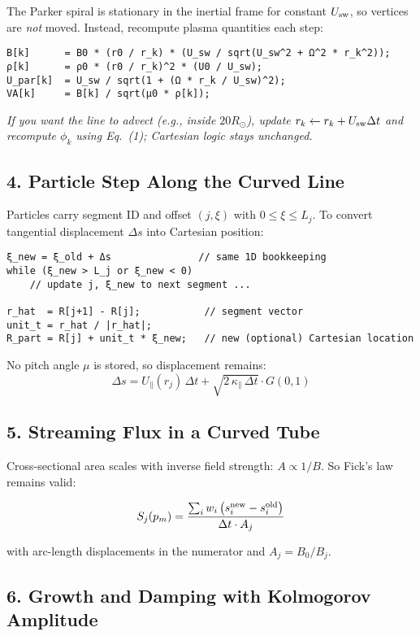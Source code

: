 The Parker spiral is stationary in the inertial frame for constant $U_{\rm sw}$, so vertices are \textit{not} moved. Instead, recompute plasma quantities each step:

\begin{lstlisting}
B[k]      = B0 * (r0 / r_k) * (U_sw / sqrt(U_sw^2 + Ω^2 * r_k^2));
ρ[k]      = ρ0 * (r0 / r_k)^2 * (U0 / U_sw);
U_par[k]  = U_sw / sqrt(1 + (Ω * r_k / U_sw)^2);
VA[k]     = B[k] / sqrt(μ0 * ρ[k]);
\end{lstlisting}

\textit{If you want the line to advect (e.g., inside $20R_\odot$), update $r_k \leftarrow r_k + U_{\rm sw} \Delta t$ and recompute $\phi_k$ using Eq.~(1); Cartesian logic stays unchanged.}

\subsection*{4. Particle Step Along the Curved Line}

Particles carry segment ID and offset $(j, \xi)$ with $0 \leq \xi \leq L_j$.
To convert tangential displacement $\Delta s$ into Cartesian position:

\begin{lstlisting}
ξ_new = ξ_old + Δs               // same 1D bookkeeping
while (ξ_new > L_j or ξ_new < 0)
    // update j, ξ_new to next segment ...

r_hat  = R[j+1] - R[j];           // segment vector
unit_t = r_hat / |r_hat|;
R_part = R[j] + unit_t * ξ_new;   // new (optional) Cartesian location
\end{lstlisting}

No pitch angle $\mu$ is stored, so displacement remains:
\[
\Delta s = U_\parallel(r_j)\,\Delta t + \sqrt{2\,\kappa_\parallel\,\Delta t}\cdot G(0,1)
\]

\subsection*{5. Streaming Flux in a Curved Tube}

Cross-sectional area scales with inverse field strength: $A \propto 1/B$. So Fick’s law remains valid:

\[
S_j(p_m) = \frac{\sum_i w_i \left( s_i^{\rm new} - s_i^{\rm old} \right)}{\Delta t \cdot A_j}
\]

with arc-length displacements in the numerator and $A_j = B_0 / B_j$.

\subsection*{6. Growth and Damping with Kolmogorov Amplitude}

